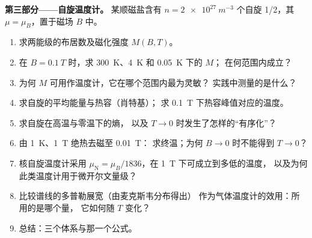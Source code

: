 \begin{problem}
\textbf{第三部分——自旋温度计。}
某顺磁盐含有 $n = \qty{2e27}{m^{-3}}$ 个自旋 1/2，其 $\mu
= \mu_B$，置于磁场 $B$ 中。
\begin{enumerate}[resume]
  \item 求两能级的布居数及磁化强度
        $M(B,T)$。
  \item 在 $B = \qty{0.1}{T}$ 时，求 \qty{300}{K}、\qty{4}{K} 和 \qty{0.05}{K} 下的 $M$；
        在何范围内成立？
  \item 为何 $M$ 可用作温度计，它在哪个范围内最为灵敏？
        实践中测量的是什么？
  \item 求自旋的平均能量与热容（肖特基）；
        求 \qty{0.1}{T} 下热容峰值对应的温度。
  \item 求自旋在高温与零温下的熵，
        以及 $T \to 0$ 时发生了怎样的“有序化”？
  \item 由 \qty{1}{K}、\qty{1}{T} 绝热去磁至 \qty{0.01}{T}：
        求终温；为何 $B \to 0$ 时不能得到 $T \to 0$？
  \item 核自旋温度计采用 $\mu_{\text{N}} = \mu_B/1836$，在
        \qty{1}{T} 下可成立到多低的温度，
        以及为何此类温度计用于微开尔文量级？
  \item 比较谱线的多普勒展宽（由麦克斯韦分布得出）
        作为气体温度计的效用：所用的是哪个量，
        它如何随 $T$ 变化？
  \item 总结：三个体系与那一个公式。
\end{enumerate}
\end{problem}
